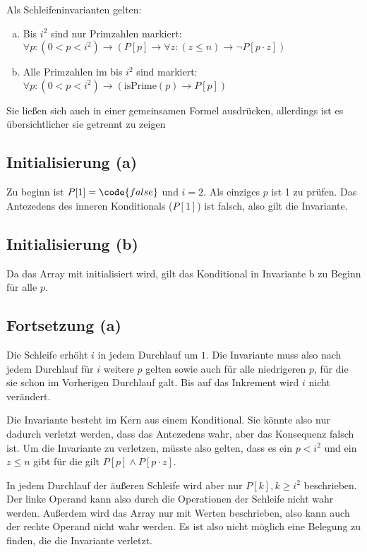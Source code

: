 \documentclass[parskip=half,a4paper]{scrartcl}
\begin{document}
Als Schleifeninvarianten gelten:

\begin{enumerate}[a)]
	\item Bis $i^2$ sind nur Primzahlen markiert: $\forall p: (0 < p < i^2) \rightarrow (P[p] \rightarrow \forall z: (z \le n) \rightarrow
	\neg P[p \cdot z])$

	\item Alle Primzahlen im bis $i^2$ sind markiert: $\forall p: (0 < p < i^2) \rightarrow (\text{isPrime}(p) \rightarrow P[p])$
\end{enumerate}

Sie ließen sich auch in einer gemeinsamen Formel ausdrücken, allerdings ist es übersichtlicher sie getrennt zu zeigen

\subsection*{Initialisierung (a)}

Zu beginn ist $P[1] = \code{false}$ und $i = 2$. Als einziges $p$ ist 1 zu prüfen. Das Antezedens des inneren Konditionals ($P[1]$) ist falsch, also gilt die Invariante.

\subsection*{Initialisierung (b)}

Da das Array mit  initialisiert wird, gilt das Konditional in Invariante b zu Beginn für alle $p$.

\subsection*{Fortsetzung (a)}

Die Schleife erhöht $i$ in jedem Durchlauf um $1$. Die Invariante muss also nach jedem Durchlauf für $i$ weitere $p$ gelten sowie auch für alle niedrigeren $p$, für die sie schon im Vorherigen Durchlauf galt. Bis auf das Inkrement wird $i$ nicht verändert.

Die Invariante besteht im Kern aus einem Konditional. Sie könnte also nur dadurch verletzt werden, dass das Antezedens wahr, aber das Konsequenz falsch ist. Um die Invariante zu verletzen, müsste also gelten, dass es ein $p < i^2$ und ein $z \le n$ gibt für die gilt $P[p] \land P[p \cdot z]$.

In jedem Durchlauf der äußeren Schleife wird aber nur $P[k], k \ge i^2$ beschrieben. Der linke Operand kann also durch die Operationen der Schleife nicht wahr werden. Außerdem wird das Array nur mit  Werten beschrieben, also kann auch der rechte Operand nicht wahr werden. Es ist also nicht möglich eine Belegung zu finden, die die Invariante verletzt.
\end{document}
